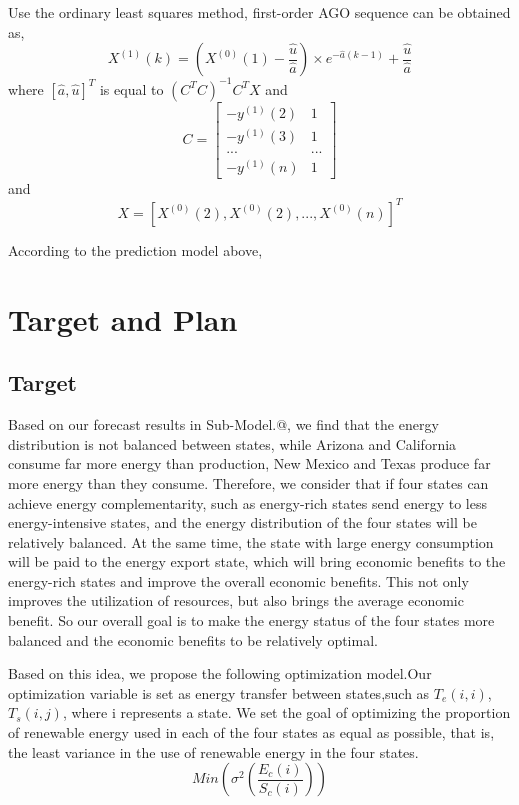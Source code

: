 \documentclass{mcmthesis}
\makeatletter
\newcommand{\Rmnum}[1]{\expandafter\@slowromancap\romannumeral #1@}
\makeatother
\begin{document}
Use the ordinary least squares method, first-order AGO sequence can be obtained as,
\begin{equation}
  X^{(1)}(k)=\left(X^{(0)}(1)-\frac{\hat{u}}{\hat{a}}\right)\times e^{-\hat{a}(k-1)}+\frac{\hat{u}}{\hat{a}}
\end{equation}
where $\left[\hat{a},\hat{u}\right]^T$ is equal to $\left(C^TC\right)^{-1}C^TX$
and
\begin{equation}
C=\begin{bmatrix}-y^{(1)}(2)&1\\-y^{(1)}(3)&1\\...&...\\-y^{(1)}(n)&1\end{bmatrix}
\end{equation}
and
\begin{equation}
  X = \left[X^{(0)}(2),X^{(0)}(2),...,X^{(0)}(n)\right]^T
\end{equation}

According to the prediction model above, 

\section{Target and Plan}
\subsection{Target}

Based on our forecast results in Sub-Model.\Rmnum{2}, we find that  the energy distribution is not balanced between states,  
while Arizona and California consume far more energy than production, New Mexico and Texas produce far more energy than they consume.
Therefore, we consider that if four states can achieve energy complementarity, such as energy-rich states send energy to less energy-intensive states, and the energy distribution of the four states will be relatively balanced.
At the same time, the state with large energy consumption will be paid to the energy export state, which will bring economic benefits to the energy-rich states and improve the overall economic benefits.
This not only improves the utilization of resources, but also brings the average economic benefit.
So our overall goal is to make the energy status of the four states more balanced and the economic benefits to be relatively optimal.

Based on this idea, we propose the following optimization model.Our optimization variable is set as energy transfer between states,such as $T_e(i,i)$, $T_s(i,j)$, where i represents a state.
We set the goal of optimizing the proportion of renewable energy used in each of the four states as equal as possible, that is, the least variance in the use of renewable energy in the four states.
\begin{equation}
  Min{\left({\sigma}^2\left(\frac{E_c(i)}{S_c(i)}\right)\right)}
\end{equation}
\end{document}
